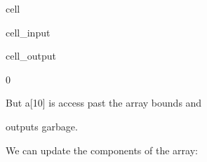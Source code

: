 \documentclass[a4paper,10pt,english]{jupyterBook}
\begin{document}
\begin{sphinxuseclass}{cell}\begin{sphinxVerbatimInput}

\begin{sphinxuseclass}{cell_input}
\begin{sphinxVerbatim}[commandchars=\\\{\}]
\PYG{p}{[}\PYG{p}{]}
\end{sphinxVerbatim}

\end{sphinxuseclass}\end{sphinxVerbatimInput}
\begin{sphinxVerbatimOutput}

\begin{sphinxuseclass}{cell_output}
\begin{sphinxVerbatim}[commandchars=\\\{\}]
0
\end{sphinxVerbatim}

\end{sphinxuseclass}\end{sphinxVerbatimOutput}

\end{sphinxuseclass}
\sphinxAtStartPar
But a{[}10{]} is access past the array bounds and

\begin{sphinxVerbatim}[commandchars=\\\{\}]
\PYG{p}{[}\PYG{p}{]}
\end{sphinxVerbatim}

\sphinxAtStartPar
outputs garbage.

\sphinxAtStartPar
We can update the components of the array:
\end{document}
